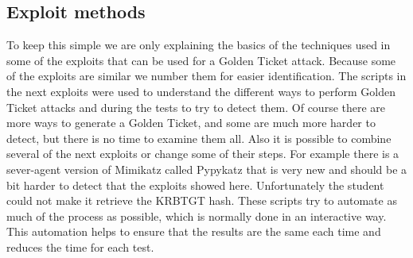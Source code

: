 \subsection{Exploit methods}
To keep this simple we are only explaining the basics of the techniques used in some of the exploits that can be used for a Golden Ticket attack. Because some of the exploits are similar we number them for easier identification. The scripts in the next exploits were used to understand the different ways to perform Golden Ticket attacks and during the tests to try to detect them. Of course there are more ways to generate a Golden Ticket, and some are much more harder to detect, but there is no time to examine them all. Also it is possible to combine several of the next exploits or change some of their steps.
\linej
For example there is a sever-agent version of Mimikatz called Pypykatz\cite{pypykatz_agent}\cite{pypykatz_server} that is very new and should be a bit harder to detect that the exploits showed here. Unfortunately the student could not make it retrieve the KRBTGT hash.
\linej
\linej
These scripts try to automate as much of the process as possible, which is normally done in an interactive way. This automation helps to ensure that the results are the same each time and reduces the time for each test.

